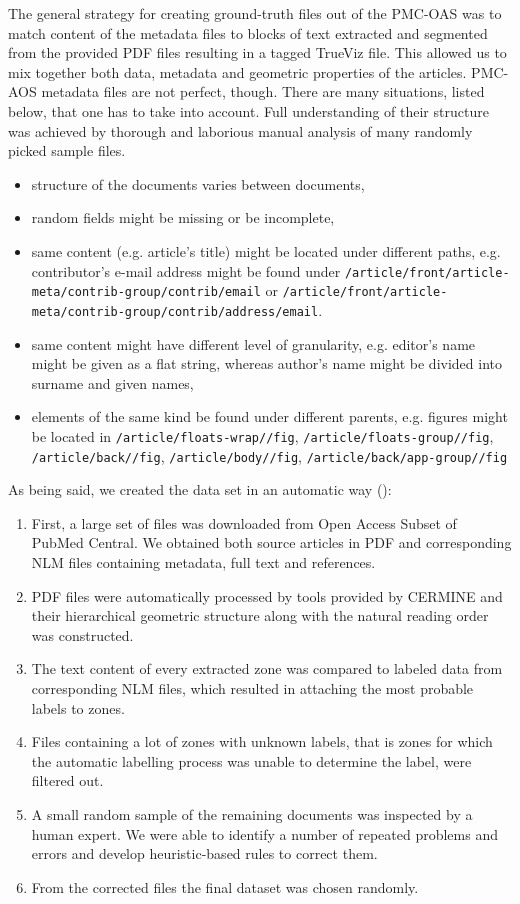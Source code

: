 The general strategy for creating ground-truth files out of the PMC-OAS was to match content of the metadata files to blocks of text extracted and segmented from the provided PDF files resulting in a tagged TrueViz file. This allowed us to mix together both data, metadata and geometric properties of the articles. PMC-AOS metadata files are not perfect, though. There are many situations, listed below, that one has to take into account. Full understanding of their structure was achieved by thorough and laborious manual analysis of many randomly picked sample files.
\begin{itemize}
\item structure of the documents varies between documents,
\item random fields might be missing or be incomplete,
\item same content (e.g. article's title) might be located under different paths, e.g. contributor's e-mail address might be found under \verb+/article/front/article-meta/contrib-group/contrib/email+ or \verb+/article/front/article-meta/contrib-group/contrib/address/email+.
\item same content might have different level of granularity, e.g. editor's name might be given as a flat string, whereas author's name might be divided into surname and given names,
\item elements of the same kind be found under different parents, e.g. figures might be located in \verb+/article/floats-wrap//fig+, \verb+/article/floats-group//fig+, \verb+/article/back//fig+, \verb+/article/body//fig+, \verb+/article/back/app-group//fig+
\end{itemize}
As being said, we created the data set in an automatic way (\cite{DominikaTkaczykPaweSzostek2014}):
\begin{enumerate}
    \item First, a large set of files was downloaded from Open Access Subset of PubMed Central. We obtained both source articles in PDF and corresponding NLM files containing metadata, full text and references.
    \item PDF files were automatically processed by tools provided by CERMINE and their hierarchical geometric structure along with the natural reading order was constructed.
    \item The text content of every extracted zone was compared to labeled data from corresponding NLM files, which resulted in attaching the most probable labels to zones.
    \item Files containing a lot of zones with unknown labels, that is zones for which the automatic labelling process was unable to determine the label, were filtered out.
    \item A small random sample of the remaining documents was inspected by a human expert. We were able to identify a number of repeated problems and errors and develop heuristic-based rules to correct them.
    \item From the corrected files the final dataset was chosen randomly.
\end{enumerate}


